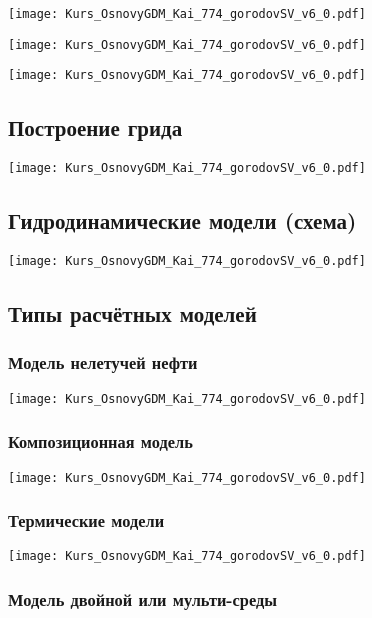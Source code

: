 \documentclass[main.tex]{subfiles}
\begin{document}
\texttt{[image: Kurs\_OsnovyGDM\_Kai\_774\_gorodovSV\_v6\_0.pdf]}

\texttt{[image: Kurs\_OsnovyGDM\_Kai\_774\_gorodovSV\_v6\_0.pdf]}

\texttt{[image: Kurs\_OsnovyGDM\_Kai\_774\_gorodovSV\_v6\_0.pdf]}

\subsection{Построение грида}

\texttt{[image: Kurs\_OsnovyGDM\_Kai\_774\_gorodovSV\_v6\_0.pdf]}

\subsection{Гидродинамические модели (схема)}

\texttt{[image: Kurs\_OsnovyGDM\_Kai\_774\_gorodovSV\_v6\_0.pdf]}

\subsection{Типы расчётных моделей}

\subsubsection{Модель нелетучей нефти}

\texttt{[image: Kurs\_OsnovyGDM\_Kai\_774\_gorodovSV\_v6\_0.pdf]}

\subsubsection{Композиционная модель}

\texttt{[image: Kurs\_OsnovyGDM\_Kai\_774\_gorodovSV\_v6\_0.pdf]}

\subsubsection{Термические модели}

\texttt{[image: Kurs\_OsnovyGDM\_Kai\_774\_gorodovSV\_v6\_0.pdf]}

\subsubsection{Модель двойной или мульти-среды}
\end{document}
